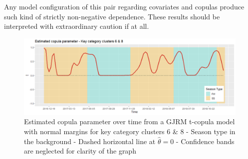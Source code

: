 Any model configuration of this pair regarding covariates and copulas produce such kind of strictly non-negative dependence. These results should be interpreted with extraordinary caution if at all.
\\



\begin{figure}[H]
\centering
  \includegraphics[width=0.95\linewidth]{figures/estimated_tau_clayton_kcc_68.png}
  \caption{Estimated copula parameter over time from a \ac{GJRM} t-copula model with normal margins for key category clusters 6 \& 8 - Season type in the background - Dashed horizontal line at $\hat{\theta} = 0$ - Confidence bands are neglected for clarity of the graph}
  \label{fig:estimated_tau_clayton_kcc_68}
\end{figure}


































